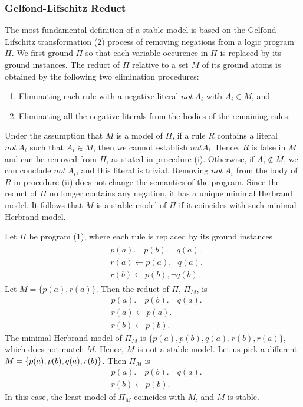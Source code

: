 \subsubsection{Gelfond-Lifschitz Reduct}
The most fundamental definition of a stable model is based on the Gelfond-Lifschitz transformation (2) 
process of removing negations from a logic program $\Pi$. 
We first ground $\Pi$ so that each variable occurence in $\Pi$ is replaced by its ground instances. 
The reduct of $\Pi$ relative to a set $M$ of its ground atoms is obtained by the following two 
elimination procedures:
\begin{enumerate}[label=(\roman*)]
    \item Eliminating each rule with a negative literal $not \: A_i$ with $A_i \in M$, and 
    \item Eliminating all the negative literals from the bodies of the remaining rules.
\end{enumerate}
Under the assumption that $M$ is a model of $\Pi$, if a rule $R$ contains a literal $not \: A_i$ 
such that $A_i \in M$, then we cannot establish $not A_i$. Hence, $R$ is false in $M$ and can be 
removed from $\Pi$, as stated in procedure (i). Otherwise, if $A_i \not \in M$, we can conclude 
$not \: A_i$, and this literal is trivial. Removing $not \: A_i$ from the body of $R$ in 
procedure (ii) does not change the semantics of the program. Since the reduct of $\Pi$ no longer 
contains any negation, it has a unique minimal Herbrand model.  
It follows that $M$ is a stable model of $\Pi$ if it coincides with such minimal Herbrand model.

Let $\Pi$ be program (1), where each rule is replaced by its ground instances 
\begin{align}
    \begin{split}
        & p(a). \hspace{1em} p(b). \hspace{1em} q(a). \\
        & r(a) \leftarrow p(a), \neg q(a). \\ 
        & r(b) \leftarrow p(b), \neg q(b).
    \end{split}
\end{align}
Let $M = \{p(a),r(a)\}$. Then the reduct of $\Pi$, $\Pi _M$, is 
\begin{align*}
    & p(a). \hspace{1em} p(b). \hspace{1em} q(a). \\
    & r(a) \leftarrow p(a). \\ 
    & r(b) \leftarrow p(b).
\end{align*}
The minimal Herbrand model of $\Pi _M$ is $\{p(a),p(b),q(a),r(b),r(a)\}$, which does not 
match $M$. Hence, $M$ is not a stable model. Let us pick a different 
$M = \{p(a),p(b),q(a),\\r(b)\}$. Then $\Pi _M$ is
\begin{align*}
    & p(a). \hspace{1em} p(b). \hspace{1em} q(a). \\
    & r(b) \leftarrow p(b). 
\end{align*}
In this case, the least model of $\Pi _M$ coincides with $M$, and $M$ is stable.

